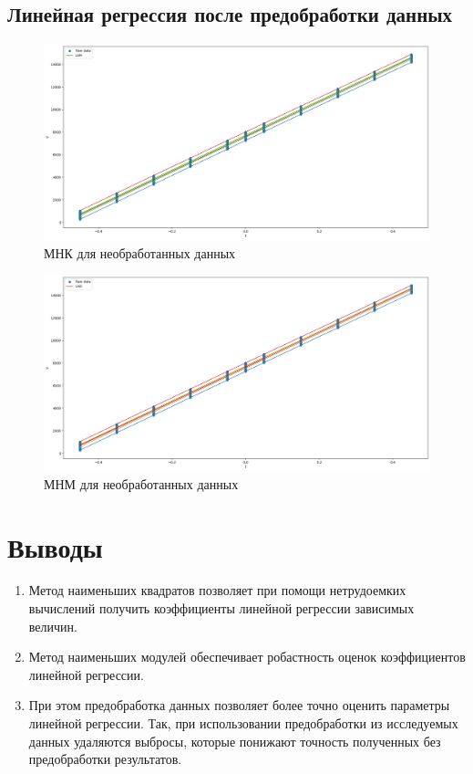 \documentclass[12pt,a4paper]{article}
\begin{document}
\subsection{Линейная регрессия после предобработки данных}
\begin{figure}[htbp!]
    \begin{center}
        \includegraphics[width = 0.6\linewidth]{plots/LSM_filtered.png}
        \caption{МНК для необработанных данных}
    \end{center}
\end{figure}
\begin{figure}[htbp!]
    \begin{center}
        \includegraphics[width = 0.6\linewidth]{plots/LAD_filtered.png}
        \caption{МНМ для необработанных данных}
    \end{center}
\end{figure}


\newpage

\section{Выводы}

\begin{enumerate}
    \item Метод наименьших квадратов позволяет при помощи нетрудоемких вычислений получить коэффициенты линейной регрессии зависимых величин.
    \item Метод наименьших модулей обеспечивает робастность оценок коэффициентов линейной регрессии.
    \item При этом предобработка данных позволяет более точно оценить параметры линейной регрессии. Так, при использовании предобработки из исследуемых данных удаляются выбросы, которые понижают точность полученных без предобработки результатов.
\end{enumerate}

\newpage
\end{document}
